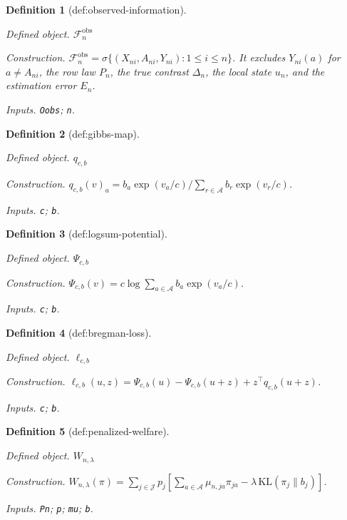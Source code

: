 \documentclass{article}
\newtheorem{definition}{Definition}
\begin{document}
\begin{definition}[def:observed-information]\label{def:observed-information}
\par\smallskip\noindent\emph{Defined object.} \(\mathcal F_n^{\mathrm{obs}}\)
\par\smallskip\noindent\emph{Construction.} \(\mathcal F_n^{\mathrm{obs}}=\sigma\{(X_{ni},A_{ni},Y_{ni}):1\le i\le n\}\). It excludes \(Y_{ni}(a)\) for \(a\ne A_{ni}\), the row law \(P_n\), the true contrast \(\Delta_n\), the local state \(u_n\), and the estimation error \(E_n\).
\par\smallskip\noindent\emph{Inputs.} \texttt{Oobs}; \texttt{n}.
\end{definition}

\begin{definition}[def:gibbs-map]\label{def:gibbs-map}
\par\smallskip\noindent\emph{Defined object.} \(q_{c,b}\)
\par\smallskip\noindent\emph{Construction.} \(q_{c,b}(v)_a=b_a\exp(v_a/c)\big/\sum_{r\in\mathcal A}b_r\exp(v_r/c)\).
\par\smallskip\noindent\emph{Inputs.} \texttt{c}; \texttt{b}.
\end{definition}

\begin{definition}[def:logsum-potential]\label{def:logsum-potential}
\par\smallskip\noindent\emph{Defined object.} \(\Psi_{c,b}\)
\par\smallskip\noindent\emph{Construction.} \(\Psi_{c,b}(v)=c\log\sum_{a\in\mathcal A}b_a\exp(v_a/c)\).
\par\smallskip\noindent\emph{Inputs.} \texttt{c}; \texttt{b}.
\end{definition}

\begin{definition}[def:bregman-loss]\label{def:bregman-loss}
\par\smallskip\noindent\emph{Defined object.} \(\ell_{c,b}\)
\par\smallskip\noindent\emph{Construction.} \(\ell_{c,b}(u,z)=\Psi_{c,b}(u)-\Psi_{c,b}(u+z)+z^{\top}q_{c,b}(u+z)\).
\par\smallskip\noindent\emph{Inputs.} \texttt{c}; \texttt{b}.
\end{definition}

\begin{definition}[def:penalized-welfare]\label{def:penalized-welfare}
\par\smallskip\noindent\emph{Defined object.} \(W_{n,\lambda}\)
\par\smallskip\noindent\emph{Construction.} \(W_{n,\lambda}(\pi)=\sum_{j\in\mathcal J}p_j[\sum_{a\in\mathcal A}\mu_{n,ja}\pi_{ja}-\lambda\,\mathrm{KL}(\pi_j\|b_j)]\).
\par\smallskip\noindent\emph{Inputs.} \texttt{Pn}; \texttt{p}; \texttt{mu}; \texttt{b}.
\end{definition}
\end{document}
